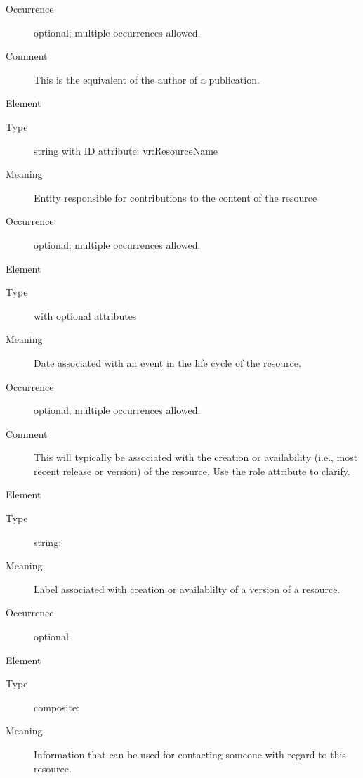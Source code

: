 \documentclass[11pt,a4paper]{ivoa}
\begin{document}
\begin{generated}
\begin{bigdescription}
\begin{description}
\item[Occurrence] optional; multiple occurrences allowed.
\item[Comment] 
                This is the equivalent of the author of a publication.
             

\end{description}
\item[Element \xmlel{contributor}]
\begin{description}
\item[Type] string with ID attribute: vr:ResourceName
\item[Meaning] 
               Entity responsible for contributions to the content of
               the resource
             
\item[Occurrence] optional; multiple occurrences allowed.

\end{description}
\item[Element \xmlel{date}]
\begin{description}
\item[Type]  with optional attributes
\item[Meaning] 
               Date associated with an event in the life cycle of the
               resource.  
             
\item[Occurrence] optional; multiple occurrences allowed.
\item[Comment] 
               This will typically be associated with the creation or 
               availability (i.e., most recent release or version) of
               the resource.  Use the role attribute to clarify.
             

\end{description}
\item[Element \xmlel{version}]
\begin{description}
\item[Type] string: 
\item[Meaning] 
               Label associated with creation or availablilty of a version of 
               a resource.
             
\item[Occurrence] optional

\end{description}
\item[Element \xmlel{contact}]
\begin{description}
\item[Type] composite: 
\item[Meaning] 
               Information that can be used for contacting someone with
               regard to this resource.
             

\end{description}
\end{bigdescription}
\end{generated}
\end{document}
